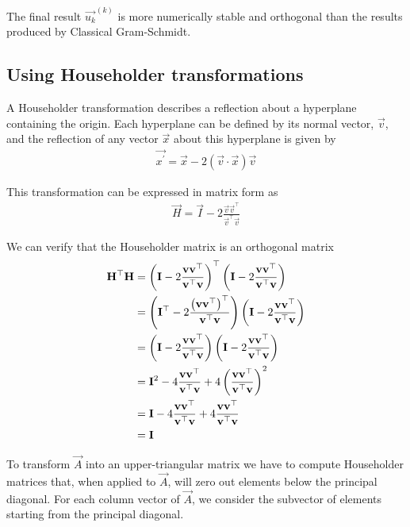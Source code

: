 \documentclass{article}
\begin{document}
The final result $\vec{u_k}^{(k)}$ is more numerically stable and orthogonal than the results
produced by Classical Gram-Schmidt.

\subsection{Using Householder transformations}

A Householder transformation describes a reflection about a hyperplane containing the origin.
Each hyperplane can be defined by its normal vector, $\vec{v}$, and the
reflection of any vector $\vec{x}$ about this hyperplane is given by
\begin{align}
    \vec{x^\prime} = \vec{x} - 2(\vec{v} \cdot \vec{x})\vec{v}
\end{align}

This transformation can be expressed in matrix form as
\begin{align}
    \vec{H} = \vec{I} - 2\frac{\vec{v}\vec{v}^\top}{\vec{v}^\top\vec{v}}
\end{align}

We can verify that the Householder matrix is an orthogonal matrix
\begin{align}
    \mathbf{H}^\top\mathbf{H} &= \left(\mathbf{I} - 2\frac{\mathbf{v}\mathbf{v}^\top}{\mathbf{v}^\top\mathbf{v}}\right)^\top\left(\mathbf{I} - 2\frac{\mathbf{v}\mathbf{v}^\top}{\mathbf{v}^\top\mathbf{v}}\right) \\
    &= \left(\mathbf{I}^\top - 2\frac{\left(\mathbf{v}\mathbf{v}^\top\right)^\top}{\mathbf{v}^\top\mathbf{v}}\right)\left(\mathbf{I} - 2\frac{\mathbf{v}\mathbf{v}^\top}{\mathbf{v}^\top\mathbf{v}}\right) \\
    &= \left(\mathbf{I} - 2\frac{\mathbf{v}\mathbf{v}^\top}{\mathbf{v}^\top\mathbf{v}}\right)\left(\mathbf{I} - 2\frac{\mathbf{v}\mathbf{v}^\top}{\mathbf{v}^\top\mathbf{v}}\right) \\
    &= \mathbf{I}^2 - 4\frac{\mathbf{v}\mathbf{v}^\top}{\mathbf{v}^\top\mathbf{v}} + 4\left(\frac{\mathbf{v}\mathbf{v}^\top}{\mathbf{v}^\top\mathbf{v}}\right)^2 \\
    &= \mathbf{I} - 4\frac{\mathbf{v}\mathbf{v}^\top}{\mathbf{v}^\top\mathbf{v}} + 4\frac{\mathbf{v}\mathbf{v}^\top}{\mathbf{v}^\top\mathbf{v}} \\
    &= \mathbf{I}
\end{align}

To transform $\vec{A}$ into an upper-triangular matrix we have to compute Householder
matrices that, when applied to $\vec{A}$, will zero out elements below the
principal diagonal. For each column vector of $\vec{A}$, we consider the subvector
of elements starting from the principal diagonal.
\end{document}
